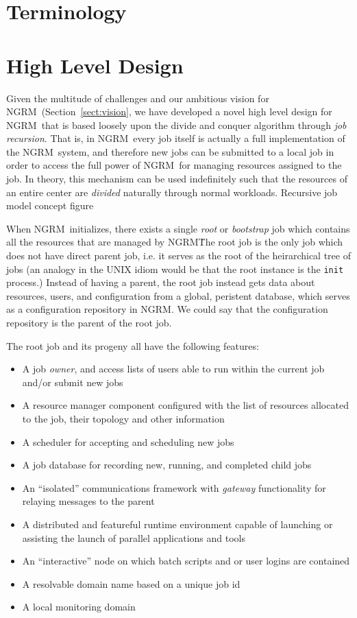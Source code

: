 \documentclass{article}
\newcommand{\ngrm}{NGRM}
\begin{document}
\section{Terminology}

\section{High Level Design}

Given the multitude of challenges and our ambitious vision for
\ngrm\ (Section~\ref{sect:vision}, we have developed a novel
high level design for \ngrm\ that is based loosely upon the
divide and conquer algorithm through {\em job recursion}. That
is, in \ngrm\ every job itself is actually a full implementation
of the \ngrm\ system, and therefore new jobs can be submitted to a
local job in order to access the full power of \ngrm\ for managing
resources assigned to the job. In theory, this mechanism can be
used indefinitely such that the resources of an entire center
are {\em divided} naturally through normal workloads.  %
Recursive job model concept figure

When \ngrm\ initializes, there exists a single {\em root} or {\em
bootstrap} job which contains all the resources that are managed
by \ngrm\. The root job is the only job which does not have direct
parent job, i.e. it serves as the root of the heirarchical tree of
jobs (an analogy in the UNIX idiom would be that the root instance
is the {\tt init} process.) Instead of having a parent, the root
job instead gets data about resources, users, and configuration
from a global, peristent database, which serves as a configuration
repository in \ngrm. We could say that the configuration repository
is the parent of the root job.

The root job and its progeny all have the following features:

\begin{itemize}
\item{A job {\em owner}, and access lists of users able to run
      within the  current job and/or submit new jobs}
\item{A resource manager component configured with the list of
      resources allocated to the job, their topology and other information}
\item{A scheduler for accepting and scheduling new jobs}
\item{A job database for recording new, running, and completed child jobs}
\item{An ``isolated'' communications framework with {\em gateway} functionality
      for relaying messages to the parent}
\item{A distributed and featureful runtime environment capable of launching
      or assisting the launch of parallel applications and tools}
\item{An ``interactive'' node on which batch scripts and or user logins
       are contained}
\item{A resolvable domain name based on a unique job id}
\item{A local monitoring domain}
\end{itemize}
\end{document}
